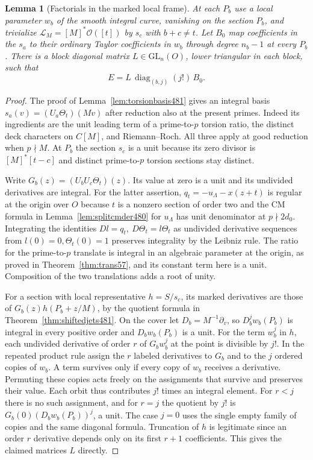 \documentclass[a4paper,11pt]{article}
\newtheorem{lemma}[proposition]{Lemma}
\theoremstyle{definition}
\theoremstyle{remark}
\numberwithin{equation}{section}
\begin{document}
\begin{lemma}[Factorials in the marked local frame]\leavevmode
\label{lem:jetframe485}
At each \(P_b\) use a local parameter \(w_b\) of the smooth
integral curve, vanishing on the section \(P_b\), and trivialize
\(\mathcal L_M=[M]^*\mathcal O([t])\) by \(s_c\) with \(b+c\ne t\).
Let \(B_0\) map coefficients in the \(s_a\) to their ordinary
Taylor coefficients in \(w_b\) through degree \(n_b-1\) at every
\(P_b\). There is a block diagonal matrix
\(L\in\mathrm{GL}_n(O)\), lower triangular in each block, such that
\[
             E=L\,\operatorname{diag}_{(b,j)}(j!)\,B_0 .
\]
\end{lemma}
\begin{proof}
The proof of Lemma~\ref{lem:torsionbasis481} gives an integral
basis \(s_a(v)=(U_a\Theta_t)(Mv)\) after reduction also at the
present primes. Indeed its ingredients are the unit leading
term of a prime-to-\(p\) torsion ratio, the distinct deck
characters on \(C[M]\), and Riemann--Roch. All three apply at
good reduction when \(p\nmid M\). At \(P_b\) the section \(s_c\)
is a unit because its zero divisor is \([M]^*[t-c]\) and distinct
prime-to-\(p\) torsion sections stay distinct.

Write \(G_b(z)=(U_bU_c\Theta_t)(z)\). Its value at zero is a
unit and its undivided derivatives are integral. For the latter
assertion, \(q_t=-u_\Lambda-x(z+t)\) is regular at the origin
over \(O\) because \(t\) is a nonzero section of order two and the CM
formula in Lemma~\ref{lem:splitcmder480} for \(u_\Lambda\) has
unit denominator at \(p\nmid2d_0\). Integrating the identities
\(Dl=q_t,\ D\Theta_t=l\Theta_t\) as undivided derivative
sequences from \(l(0)=0,\Theta_t(0)=1\) preserves integrality
by the Leibniz rule. The ratio for the prime-to-\(p\) translate
is integral in an algebraic parameter at the origin, as proved
in Theorem~\ref{thm:trans57}, and its constant term here is a
unit. Composition of the two translations adds a root of unity.

For a section with local representative \(h=S/s_c\), its marked
derivatives are those of \(G_b(z)h(P_b+z/M)\), by the quotient
formula in Theorem~\ref{thm:shiftedjets481}. On the cover let
\(D_b=M^{-1}\partial_v\), so \(D_b^j w_b(P_b)\) is integral
in every positive order and \(D_b w_b(P_b)\) is a unit.
For the term \(w_b^j\) in \(h\), each undivided derivative of
order \(r\) of \(G_bw_b^j\) at the point is divisible by \(j!\).
In the repeated product rule assign the \(r\) labeled derivatives
to \(G_b\) and to the \(j\) ordered copies of \(w_b\). A term
survives only if every copy of \(w_b\) receives a derivative.
Permuting these copies acts freely on the assignments that
survive and preserves their value. Each orbit thus contributes
\(j!\) times an integral element. For \(r<j\) there is no such
assignment, and for \(r=j\) the quotient by \(j!\) is
\(G_b(0)(D_bw_b(P_b))^j\), a unit. The case \(j=0\) uses the
single empty family of copies and the same diagonal formula.
Truncation of \(h\) is legitimate since an order \(r\) derivative
depends only on its first \(r+1\) coefficients. This gives the
claimed matrices \(L\) directly.
\end{proof}
\end{document}
